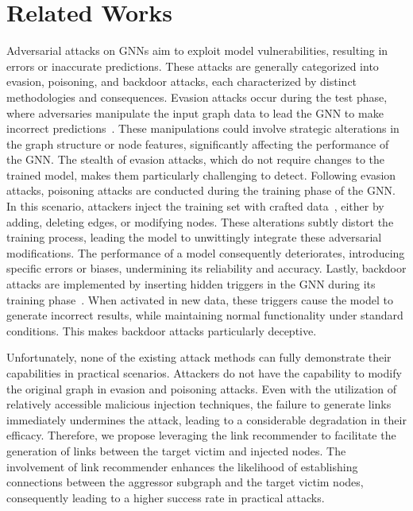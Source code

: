 \section{Related Works}
Adversarial attacks on GNNs aim to exploit model vulnerabilities, resulting in errors or inaccurate predictions. These attacks are generally categorized into evasion, poisoning, and backdoor attacks, each characterized by distinct methodologies and consequences. Evasion attacks occur during the test phase, where adversaries manipulate the input graph data to lead the GNN to make incorrect predictions~\cite{Nettack,TDGIA,MinMax}. These manipulations could involve strategic alterations in the graph structure or node features, significantly affecting the performance of the GNN. The stealth of evasion attacks, which do not require changes to the trained model, makes them particularly challenging to detect. Following evasion attacks, poisoning attacks are conducted during the training phase of the GNN. In this scenario, attackers inject the training set with crafted data~\cite{RL-S2V,NIPA}, either by adding, deleting edges, or modifying nodes. These alterations subtly distort the training process, leading the model to unwittingly integrate these adversarial modifications. The performance of a model consequently deteriorates, introducing specific errors or biases, undermining its reliability and accuracy. Lastly, backdoor attacks are implemented by inserting hidden triggers in the GNN during its training phase~\cite{Backdoor_Attack_1,Backdoor_Attack_2,UGBA}. When activated in new data, these triggers cause the model to generate incorrect results, while maintaining normal functionality under standard conditions. This makes backdoor attacks particularly deceptive.

Unfortunately, none of the existing attack methods can fully demonstrate their capabilities in practical scenarios. Attackers do not have the capability to modify the original graph in evasion and poisoning attacks. Even with the utilization of relatively accessible malicious injection techniques, the failure to generate links immediately undermines the attack, leading to a considerable degradation in their efficacy. Therefore, we propose leveraging the link recommender to facilitate the generation of links between the target victim and injected nodes. The involvement of link recommender enhances the likelihood of establishing connections between the aggressor subgraph and the target victim nodes, consequently leading to a higher success rate in practical attacks.